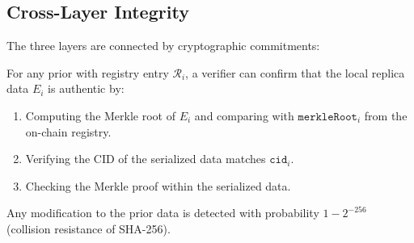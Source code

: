 \subsection{Cross-Layer Integrity}

The three layers are connected by cryptographic commitments:

\begin{proposition}
For any prior with registry entry $\mathcal{R}_i$, a verifier can confirm that
the local replica data $E_i$ is authentic by:
\begin{enumerate}[leftmargin=1.5em]
    \item Computing the Merkle root of $E_i$ and comparing with
          $\texttt{merkleRoot}_i$ from the on-chain registry.
    \item Verifying the CID of the serialized data matches $\texttt{cid}_i$.
    \item Checking the Merkle proof within the serialized data.
\end{enumerate}
Any modification to the prior data is detected with probability
$1 - 2^{-256}$ (collision resistance of SHA-256).
\end{proposition}

